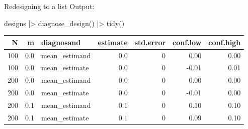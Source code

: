 \documentclass[
  11pt,
  ignorenonframetext,
]{beamer}
\newenvironment{Shaded}{\begin{snugshade}}{\end{snugshade}}
\newcommand{\FunctionTok}[1]{\textcolor[rgb]{0.28,0.35,0.67}{#1}}
\newcommand{\NormalTok}[1]{\textcolor[rgb]{0.00,0.23,0.31}{#1}}
\newcommand{\SpecialCharTok}[1]{\textcolor[rgb]{0.37,0.37,0.37}{#1}}
\begin{document}
\begin{frame}[fragile]{Redesigning to a list}
\protect\hypertarget{redesigning-to-a-list-2}{}
Output:

\begin{Shaded}
\begin{Highlighting}[]
\NormalTok{designs }\SpecialCharTok{|\textgreater{}} \FunctionTok{diagnose\_design}\NormalTok{() }\SpecialCharTok{|\textgreater{}} \FunctionTok{tidy}\NormalTok{() }
\end{Highlighting}
\end{Shaded}

\begin{tabular}{r|r|l|r|r|r|r}
\hline
N & m & diagnosand & estimate & std.error & conf.low & conf.high\\
\hline
100 & 0.0 & mean\_estimand & 0.0 & 0 & 0.00 & 0.00\\
\hline
100 & 0.0 & mean\_estimate & 0.0 & 0 & -0.01 & 0.01\\
\hline
200 & 0.0 & mean\_estimand & 0.0 & 0 & 0.00 & 0.00\\
\hline
200 & 0.0 & mean\_estimate & 0.0 & 0 & -0.01 & 0.00\\
\hline
200 & 0.1 & mean\_estimand & 0.1 & 0 & 0.10 & 0.10\\
\hline
200 & 0.1 & mean\_estimate & 0.1 & 0 & 0.09 & 0.10\\
\hline
\end{tabular}
\end{frame}
\end{document}
